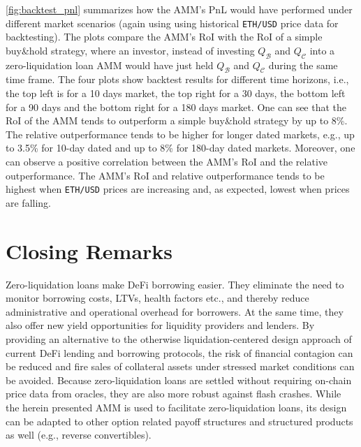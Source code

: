 \documentclass[a4paper]{article}
\begin{document}
\cref{fig:backtest_pnl} summarizes how the AMM's PnL would have performed under different market scenarios (again using using historical \verb|ETH/USD| price data for backtesting). The plots compare the AMM's RoI with the RoI of a simple buy\&hold strategy, where an investor, instead of investing $Q_\mathcal{B}$ and $Q_\mathcal{C}$ into a zero-liquidation loan AMM would have just held $Q_\mathcal{B}$ and $Q_\mathcal{C}$ during the same time frame. The four plots show backtest results for different time horizons, i.e., the top left is for a 10 days market, the top right for a 30 days, the bottom left for a 90 days and the bottom right for a 180 days market. One can see that the RoI of the AMM tends to outperform a simple buy\&hold strategy by up to 8\%. The relative outperformance tends to be higher for longer dated markets, e.g., up to 3.5\% for 10-day dated and up to 8\% for 180-day dated markets. Moreover, one can observe a positive correlation between the AMM's RoI and the relative outperformance. The AMM's RoI and relative outperformance tends to be highest when \verb|ETH/USD| prices are increasing and, as expected, lowest when prices are falling.



\section{Closing Remarks}
Zero-liquidation loans make DeFi borrowing easier. They eliminate the need to monitor borrowing costs, LTVs, health factors etc., and thereby reduce administrative and operational overhead for borrowers. At the same time, they also offer new yield opportunities for liquidity providers and lenders. By providing an alternative to the otherwise liquidation-centered design approach of current DeFi lending and borrowing protocols, the risk of financial contagion can be reduced and fire sales of collateral assets under stressed market conditions can be avoided. Because zero-liquidation loans are settled without requiring on-chain price data from oracles, they are also more robust against flash crashes. While the herein presented AMM is used to facilitate zero-liquidation loans, its design can be adapted to other option related payoff structures and structured products as well (e.g., reverse convertibles). %

\newpage


\end{document}
